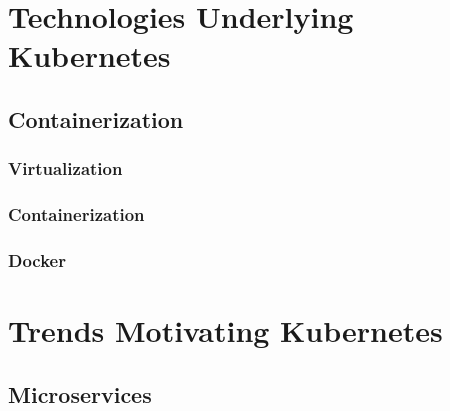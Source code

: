 \documentclass[twoside]{report}
\begin{document}
\section{Technologies Underlying Kubernetes}

\subsection{Containerization}

\subsubsection{Virtualization}

\subsubsection{Containerization}

\subsubsection{Docker}

\section{Trends Motivating Kubernetes}

\subsection{Microservices}



\end{document}
